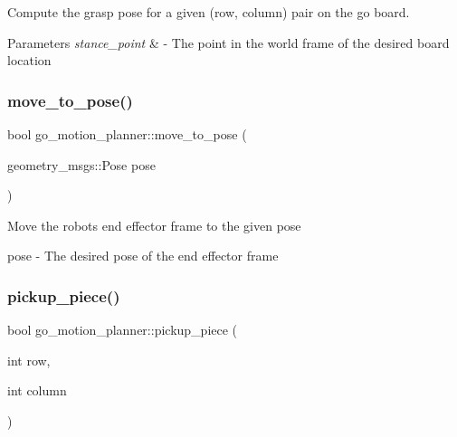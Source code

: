 Compute the grasp pose for a given (row, column) pair on the go board. 


\begin{DoxyParams}{Parameters}
{\em stance\+\_\+point} & -\/ The point in the world frame of the desired board location \\
\hline
\end{DoxyParams}
\mbox{\label{classgo__motion__planner_a2be951f1c56888d0e710290c884a6050}} 
\subsubsection{\texorpdfstring{move\+\_\+to\+\_\+pose()}{move\_to\_pose()}}
{\footnotesize\ttfamily bool go\+\_\+motion\+\_\+planner\+::move\+\_\+to\+\_\+pose (\begin{DoxyParamCaption}\item[{geometry\+\_\+msgs\+::\+Pose}]{pose }\end{DoxyParamCaption})}




\begin{DoxyItemize}
\item Move the robot\textquotesingle{}s end effector frame to the given pose 
\end{DoxyItemize}

pose -\/ The desired pose of the end effector frame \mbox{\label{classgo__motion__planner_acda1c3562a9863181f4dbd1deaff3ff3}} 
\subsubsection{\texorpdfstring{pickup\+\_\+piece()}{pickup\_piece()}}
{\footnotesize\ttfamily bool go\+\_\+motion\+\_\+planner\+::pickup\+\_\+piece (\begin{DoxyParamCaption}\item[{int}]{row,  }\item[{int}]{column }\end{DoxyParamCaption})}




